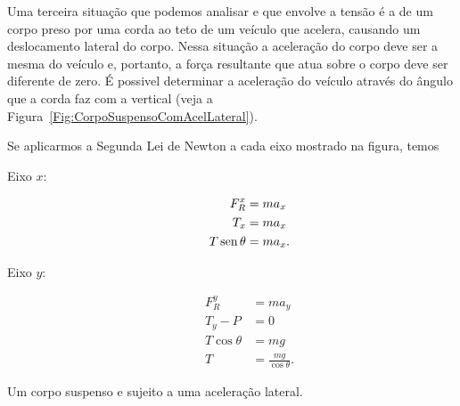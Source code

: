 Uma terceira situação que podemos analisar e que envolve a tensão é a de um corpo preso por uma corda ao teto de um veículo que acelera, causando um deslocamento lateral do corpo. Nessa situação a aceleração do corpo deve ser a mesma do veículo e, portanto, a força resultante que atua sobre o corpo deve ser diferente de zero. É possivel determinar a aceleração do veículo através do ângulo que a corda faz com a vertical (veja a Figura~\ref{Fig:CorpoSuspensoComAcelLateral}).

Se aplicarmos a Segunda Lei de Newton a cada eixo mostrado na figura, temos
\begin{description}
    \item[Eixo $x$:] 
        \begin{align}
            F_R^x &= m a_x \\
            T_x &= m a_x \\
            T\operatorname{sen}\theta &= m a_x. \label{Eq:CorpoSuspensoComAcelLateralX}
        \end{align}
    \item[Eixo $y$:]
        \begin{align}
            F_R^y &= m a_y \\
            T_y - P &= 0 \\
            T \cos\theta &= mg \\
            T &= \frac{mg}{\cos\theta}. \label{Eq:CorpoSuspensoComAcelLateralY}
        \end{align}
\end{description}

\begin{marginfigure}[-8cm]
\centering
{}
\caption{Um corpo suspenso e sujeito a uma aceleração lateral.\label{Fig:CorpoSuspensoComAcelLateral}}
\end{marginfigure}

